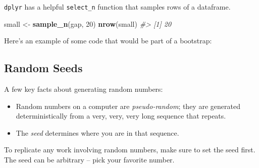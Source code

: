 \documentclass[
]{book}
\newenvironment{Shaded}{\begin{snugshade}}{\end{snugshade}}
\newcommand{\CommentTok}[1]{\textcolor[rgb]{0.56,0.35,0.01}{\textit{#1}}}
\newcommand{\DataTypeTok}[1]{\textcolor[rgb]{0.13,0.29,0.53}{#1}}
\newcommand{\DecValTok}[1]{\textcolor[rgb]{0.00,0.00,0.81}{#1}}
\newcommand{\KeywordTok}[1]{\textcolor[rgb]{0.13,0.29,0.53}{\textbf{#1}}}
\newcommand{\NormalTok}[1]{#1}
\newcommand{\OperatorTok}[1]{\textcolor[rgb]{0.81,0.36,0.00}{\textbf{#1}}}
\newcommand{\OtherTok}[1]{\textcolor[rgb]{0.56,0.35,0.01}{#1}}
\newcommand{\StringTok}[1]{\textcolor[rgb]{0.31,0.60,0.02}{#1}}
\providecommand{\tightlist}{%
  \setlength{\itemsep}{0pt}\setlength{\parskip}{0pt}}
\begin{document}
\texttt{dplyr} has a helpful \texttt{select\_n} function that samples rows of a dataframe.

\begin{Shaded}
\begin{Highlighting}[]
\NormalTok{small <-}\StringTok{ }\KeywordTok{sample_n}\NormalTok{(gap, }\DecValTok{20}\NormalTok{)}
\KeywordTok{nrow}\NormalTok{(small)}
\CommentTok{#> [1] 20}
\end{Highlighting}
\end{Shaded}

Here's an example of some code that would be part of a bootstrap:

\begin{Shaded}
\end{Shaded}

\hypertarget{random-seeds}{%
\subsection{Random Seeds}\label{random-seeds}}

A few key facts about generating random numbers:

\begin{itemize}
\tightlist
\item
  Random numbers on a computer are \emph{pseudo-random}; they are generated deterministically from a very, very, very long sequence that repeats.
\item
  The \emph{seed} determines where you are in that sequence.
\end{itemize}

To replicate any work involving random numbers, make sure to set the seed first. The seed can be arbitrary -- pick your favorite number.
\end{document}
